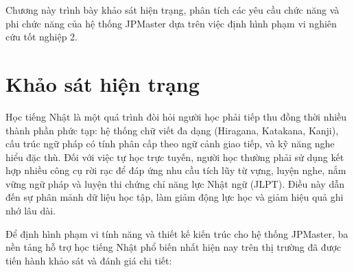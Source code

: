\documentclass[../DoAn.tex]{subfiles}
\begin{document}
Chương này trình bày khảo sát hiện trạng, phân tích các yêu cầu chức năng và phi chức năng của hệ thống JPMaster dựa trên việc định hình phạm vi nghiên cứu tốt nghiệp 2.

\section{Khảo sát hiện trạng}
\label{section:2.1}

Học tiếng Nhật là một quá trình đòi hỏi người học phải tiếp thu đồng thời nhiều thành phần phức tạp: hệ thống chữ viết đa dạng (Hiragana, Katakana, Kanji), cấu trúc ngữ pháp có tính phân cấp theo ngữ cảnh giao tiếp, và kỹ năng nghe hiểu đặc thù. Đối với việc tự học trực tuyến, người học thường phải sử dụng kết hợp nhiều công cụ rời rạc để đáp ứng nhu cầu tích lũy từ vựng, luyện nghe, nắm vững ngữ pháp và luyện thi chứng chỉ năng lực Nhật ngữ (JLPT). Điều này dẫn đến sự phân mảnh dữ liệu học tập, làm giảm động lực học và giảm hiệu quả ghi nhớ lâu dài.

Để định hình phạm vi tính năng và thiết kế kiến trúc cho hệ thống JPMaster, ba nền tảng hỗ trợ học tiếng Nhật phổ biến nhất hiện nay trên thị trường đã được tiến hành khảo sát và đánh giá chi tiết:
\end{document}
